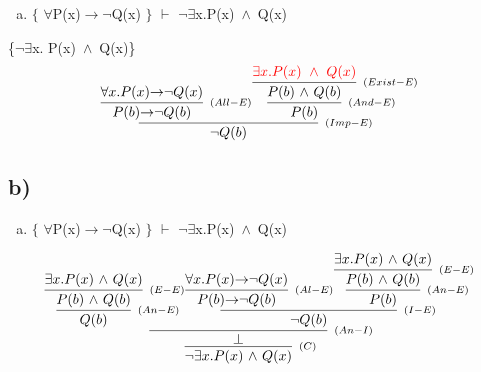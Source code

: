 \documentclass[aspectratio=43]{beamer}
\newcommand{\ria}{$\rightarrow$}
\newcommand{\fall}{$\forall$}
\newcommand{\ex}{$\exists$}
\newcommand{\nao}{$\neg$}
\newcommand{\nex}{\nao\ex}
\newcommand{\andd}{$\wedge$}
\begin{document}
    \begin{frame}[fragile]
    	
    	\begin{enumerate}[b)]
			
			\item $\{$ \fall P(x)\ria \nao Q(x) $\}$ $\vdash$ \nex  x.P(x)\ \andd\ Q(x) \\ 
			
		\end{enumerate}
        \{\nex  x. P(x)\ \andd\ Q(x)\}
        \vspace{90pt}
        \[
        \begin{array}{c}
		
        	\infer[_{(Imp-E)}]
            {$\nao$ Q(b)}
            {\infer[_{(All-E)}] 
            	{P(b) $\ria$ $\nao$ Q(b)}
               	{$\fall$x.P(x)$\ria$ $\nao$ Q(x)} 
            \infer[_{(And-E)}] 
                {P(b)} 
                {\infer[_{(Exist-E)}] 
                        	{P(b)\ $\andd$\ Q(b)}
                        	{\textcolor{red}{\exists x.P(x)\ \wedge\ Q(x)}}
                }
            }
		\end{array}
        \]
        
	\end{frame}
    
    \subsection{b)}
        
	\begin{frame}[fragile]
    
    	\begin{enumerate}[b)]
			
			\item $\{$ \fall P(x)\ria \nao Q(x) $\}$ $\vdash$ \nex  x.P(x)\ \andd\ Q(x) \\ 
			
		\end{enumerate}
        \vspace{50pt}
		\[
        \begin{array}{c}
		\infer[_{(C)}]
			{$\nex$ x.P(x)\ $\andd$\ Q(x)}
			{\infer[_{(An-I)}] 
            	{\bot}
                {\infer[_{(An-E)}] 
                	{Q(b)}
                    {\infer[_{(E-E)}]
                    	{P(b)\ $\andd$\ Q(b)}
                        {$\ex$x.P(x)\ $\andd$\ Q(x)}
                    }
                \infer[_{(I-E)}] 
                	{$\nao$ Q(b)}
                	{\infer[_{(Al-E)}] 
                    	{P(b) $\ria$ $\nao$ Q(b)}
                    	{$\fall$x.P(x)$\ria$ $\nao$ Q(x)}
                    \infer[_{(An-E)}] 
                    	{P(b)}
                        {\infer[_{(E-E)}] 
                        	{P(b)\ $\andd$\ Q(b)}
                        	{$\ex$x.P(x)\ $\andd$\ Q(x)}
                        }
                    }
                }
            }
		\end{array}
        \]
		
	\end{frame}
	
\end{document}
